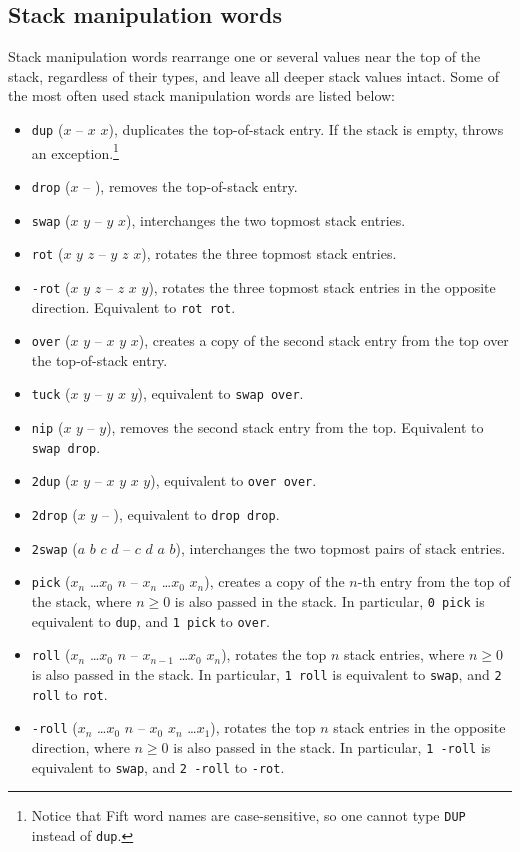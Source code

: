\documentclass[12pt,oneside]{article}
\def\mysubsection#1{\subsection{#1}\fancyhead[C]{\small{\textsc{\textrm{\thesubsection.} #1}}}}
\begin{document}
\mysubsection{Stack manipulation words}\label{p:stack.ops}
Stack manipulation words rearrange one or several values near the top of the stack, regardless of their types, and leave all deeper stack values intact. Some of the most often used stack manipulation words are listed below:
\begin{itemize}
\item {\tt dup} ($x$ -- $x$ $x$), duplicates the top-of-stack entry. If the stack is empty, throws an exception.\footnote{Notice that Fift word names are case-sensitive, so one cannot type {\tt DUP} instead of {\tt dup}.}
\item {\tt drop} ($x$ -- ), removes the top-of-stack entry.
\item {\tt swap} ($x$ $y$ -- $y$ $x$), interchanges the two topmost stack entries.
\item {\tt rot} ($x$ $y$ $z$ -- $y$ $z$ $x$), rotates the three topmost stack entries.
\item {\tt -rot} ($x$ $y$ $z$ -- $z$ $x$ $y$), rotates the three topmost stack entries in the opposite direction. Equivalent to {\tt rot rot}.
\item {\tt over} ($x$ $y$ -- $x$ $y$ $x$), creates a copy of the second stack entry from the top over the top-of-stack entry.
\item {\tt tuck} ($x$ $y$ -- $y$ $x$ $y$), equivalent to {\tt swap over}.
\item {\tt nip} ($x$ $y$ -- $y$), removes the second stack entry from the top. Equivalent to {\tt swap drop}.
\item {\tt 2dup} ($x$ $y$ -- $x$ $y$ $x$ $y$), equivalent to {\tt over over}.
\item {\tt 2drop} ($x$ $y$ -- ), equivalent to {\tt drop drop}.
\item {\tt 2swap} ($a$ $b$ $c$ $d$ -- $c$ $d$ $a$ $b$), interchanges the two topmost pairs of stack entries.
\item {\tt pick} ($x_n$ \dots $x_0$ $n$ -- $x_n$ \dots $x_0$ $x_n$), creates a copy of the $n$-th entry from the top of the stack, where $n\geq0$ is also passed in the stack. In particular, {\tt 0 pick} is equivalent to {\tt dup}, and {\tt 1 pick} to {\tt over}.
\item {\tt roll} ($x_n$ \dots $x_0$ $n$ -- $x_{n-1}$ \dots $x_0$ $x_n$), rotates the top $n$ stack entries, where $n\geq0$ is also passed in the stack. In particular, {\tt 1 roll} is equivalent to {\tt swap}, and {\tt 2 roll} to {\tt rot}.
\item {\tt -roll} ($x_n$ \dots $x_0$ $n$ -- $x_0$ $x_n$ \dots $x_1$), rotates the top $n$ stack entries in the opposite direction, where $n\geq0$ is also passed in the stack. In particular, {\tt 1 -roll} is equivalent to {\tt swap}, and {\tt 2 -roll} to {\tt -rot}.

\end{itemize}
\end{document}
